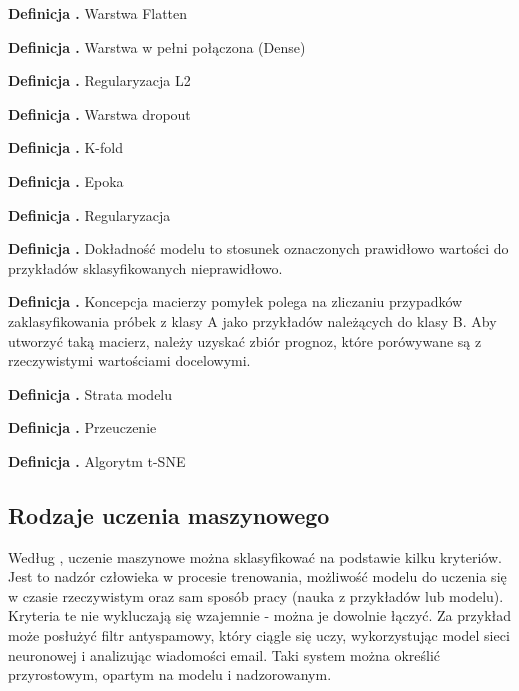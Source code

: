 \noindent
\textbf{Definicja \mlDefinitionIndex.}
\incrementMlDefinitionIndex
Warstwa Flatten

\noindent
\textbf{Definicja \mlDefinitionIndex.}
\incrementMlDefinitionIndex
Warstwa w pełni połączona (Dense)

\noindent
\textbf{Definicja \mlDefinitionIndex.}
\incrementMlDefinitionIndex
Regularyzacja L2

\noindent
\textbf{Definicja \mlDefinitionIndex.}
\incrementMlDefinitionIndex
Warstwa dropout

\noindent
\textbf{Definicja \mlDefinitionIndex.}
\incrementMlDefinitionIndex
K-fold

\noindent
\textbf{Definicja \mlDefinitionIndex.}
\incrementMlDefinitionIndex
Epoka

\noindent
\textbf{Definicja \mlDefinitionIndex.}
\incrementMlDefinitionIndex
Regularyzacja

\noindent
\textbf{Definicja \mlDefinitionIndex.}
\incrementMlDefinitionIndex
Dokładność modelu to stosunek oznaczonych prawidłowo wartości do przykładów sklasyfikowanych nieprawidłowo.

\noindent
\textbf{Definicja \mlDefinitionIndex.}
\incrementMlDefinitionIndex
Koncepcja macierzy pomyłek polega na zliczaniu przypadków zaklasyfikowania próbek z klasy A jako przykładów należących do klasy B.
Aby utworzyć taką macierz, należy uzyskać zbiór prognoz, które porówywane są z rzeczywistymi wartościami docelowymi.

\noindent
\textbf{Definicja \mlDefinitionIndex.}
\incrementMlDefinitionIndex
Strata modelu

\noindent
\textbf{Definicja \mlDefinitionIndex.}
\incrementMlDefinitionIndex
Przeuczenie

\noindent
\textbf{Definicja \mlDefinitionIndex.}
\incrementMlDefinitionIndex
Algorytm t-SNE

\subsection{Rodzaje uczenia maszynowego}
Według \cite{Geron2020}, uczenie maszynowe można sklasyfikować na podstawie kilku kryteriów.
Jest to nadzór człowieka w procesie trenowania, możliwość modelu do uczenia się w czasie rzeczywistym
oraz sam sposób pracy (nauka z przykładów lub modelu). Kryteria te nie wykluczają się wzajemnie - można je dowolnie łączyć.
Za przykład może posłużyć filtr antyspamowy, który ciągle się uczy,
wykorzystując model sieci neuronowej i analizując wiadomości email.
Taki system można określić przyrostowym, opartym na modelu i nadzorowanym.

